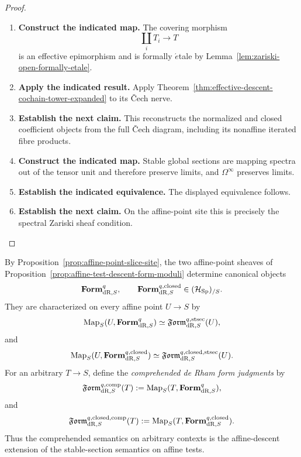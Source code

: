 \begin{proof}
\leavevmode
\begin{enumerate}[label=\textup{(\arabic*)}]
    \item \textbf{Construct the indicated map.}
    The covering morphism
    \[
    \coprod_iT_i\longrightarrow T
    \]
    is an effective epimorphism and is formally \(\acute{e}\)tale by
    Lemma~\ref{lem:zariski-open-formally-etale}.
    \item \textbf{Apply the indicated result.}
    Apply
    Theorem~\ref{thm:effective-descent-cochain-tower-expanded} to its \v{C}ech
    nerve.
    \item \textbf{Establish the next claim.}
    This reconstructs the normalized and closed coefficient objects from
    the full \v{C}ech diagram, including its nonaffine iterated fibre products.
    \item \textbf{Construct the indicated map.}
    Stable global sections are mapping spectra out of the tensor unit and therefore
    preserve limits, and \(\Omega^\infty\) preserves limits.
    \item \textbf{Establish the indicated equivalence.}
    The displayed
    equivalence follows.
    \item \textbf{Establish the next claim.}
    On the affine-point site this is precisely the spectral
    Zariski sheaf condition.
\end{enumerate}
\end{proof}

\begin{construction}
\label{con:affine-descent-form-comprehension}
By Proposition~\ref{prop:affine-point-slice-site}, the two affine-point sheaves of
Proposition~\ref{prop:affine-test-descent-form-moduli} determine canonical objects
\[
  \mathbf{Form}^q_{\mathrm{dR},S},
  \qquad
  \mathbf{Form}^{q,\mathrm{closed}}_{\mathrm{dR},S}
  \in
  (\mathcal H_{\operatorname{Sp}})_{/S}.
\]
They are characterized on every affine point \(U\to S\) by
\[
  \operatorname{Map}_S(U,\mathbf{Form}^q_{\mathrm{dR},S})
  \simeq
  \mathfrak{Form}^{q,\mathrm{stsec}}_{\mathrm{dR},S}(U),
\]
and
\[
  \operatorname{Map}_S(U,\mathbf{Form}^{q,\mathrm{closed}}_{\mathrm{dR},S})
  \simeq
  \mathfrak{Form}^{q,\mathrm{closed},\mathrm{stsec}}_{\mathrm{dR},S}(U).
\]
For an arbitrary \(T\to S\), define the \emph{comprehended de Rham form
judgments} by
\[
  \mathfrak{Form}^{q,\mathrm{comp}}_{\mathrm{dR},S}(T)
  :=
  \operatorname{Map}_S(T,\mathbf{Form}^q_{\mathrm{dR},S}),
\]
and
\[
  \mathfrak{Form}^{q,\mathrm{closed},\mathrm{comp}}_{\mathrm{dR},S}(T)
  :=
  \operatorname{Map}_S(T,\mathbf{Form}^{q,\mathrm{closed}}_{\mathrm{dR},S}).
\]
Thus the comprehended semantics on arbitrary contexts is the affine-descent
extension of the stable-section semantics on affine tests.
\end{construction}

